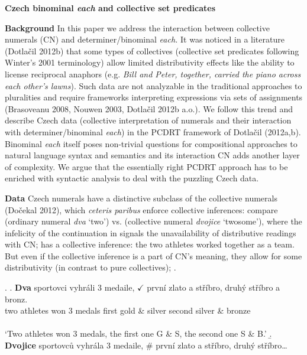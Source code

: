 \documentclass[12pt, a4paper]{scrartcl}
\begin{document}
\setlength{\Exlabelsep}{0.3em}
\setlength{\SubExleftmargin}{1.3em}
\setlength{\parindent}{0cm} %


\begin{center}
\textbf{Czech binominal \textit{each} and collective set predicates}
\end{center}

\noindent\textbf{Background} In this paper we address the interaction between collective numerals (CN) and de\-ter\-mi\-ner/bi\-no\-mi\-nal \textit{each.} It was noticed in a literature (Dotlačil 2012b) that some types of collectives (collective set predicates following Winter's 2001 terminology) allow limited distributivity effects like the ability to license reciprocal anaphors (e.g. \textit{Bill and Peter, together, carried the piano across each other's lawns}). Such data are not analyzable in the traditional approaches to pluralities and require frameworks interpreting expressions via sets of assignments (Brasoveanu 2008, Nouwen 2003, Dotlačil 2012b a.o.). We follow this trend and describe Czech data (collective interpretation of numerals and their interaction with determiner/binominal \textit{each}) in the PCDRT framework of Dotlačil (2012a,b). Binominal \textit{each} itself poses non-trivial questions for compositional approaches to natural language syntax and semantics and its interaction CN adds another layer of complexity. We argue that the essentially right PCDRT approach has to be enriched with syntactic analysis  to deal with the puzzling Czech data.

\noindent\textbf{Data} Czech numerals have a distinctive subclass of the collective numerals (Dočekal 2012), which \textit{ceteris paribus} enforce collective inferences: compare \Next[a] (ordinary numeral \textit{dva} `two') vs. \Next[b] (collective numeral \textit{dvojice} `twosome'), where the infelicity of the continuation in \Next[b] signals the unavailability of distributive readings with CN; \Next[b] has a collective inference: the two athletes worked together as a team. But even if the collective inference is a part of CN's meaning, they allow for some distributivity  (in contrast to pure collectives); \NNext.\vspace{-4pt}

\ex. \ag. \textbf{Dva} sportovci vyhráli 3 medaile, $\checkmark$\hspace{-3pt} první zlato a stříbro, druhý stříbro a bronz.\\
two athletes won 3 medals {} first gold \& silver second silver \& bronze\\ \\
`Two athletes won 3 medals, the first one G \& S, the second one S \& B.'
\b. \textbf{Dvojice} sportovců vyhrála 3 medaile, {\#}\hspace{-2pt} první zlato a stříbro, druhý stříbro\ldots
\end{document}
